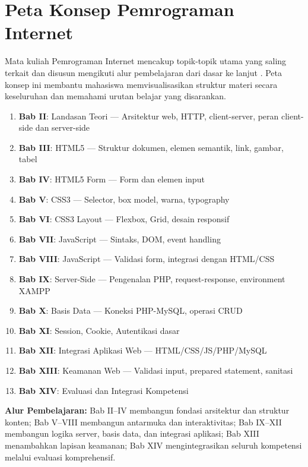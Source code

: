 \section{Peta Konsep Pemrograman Internet}

Mata kuliah Pemrograman Internet mencakup topik-topik utama yang saling terkait dan disusun mengikuti alur pembelajaran dari dasar ke lanjut \cite{mdn-learn}. Peta konsep ini membantu mahasiswa memvisualisasikan struktur materi secara keseluruhan dan memahami urutan belajar yang disarankan.

\begin{enumerate}
  \item \textbf{Bab II}: Landasan Teori --- Arsitektur web, HTTP, client-server, peran client-side dan server-side
  \item \textbf{Bab III}: HTML5 --- Struktur dokumen, elemen semantik, link, gambar, tabel
  \item \textbf{Bab IV}: HTML5 Form --- Form dan elemen input
  \item \textbf{Bab V}: CSS3 --- Selector, box model, warna, typography
  \item \textbf{Bab VI}: CSS3 Layout --- Flexbox, Grid, desain responsif
  \item \textbf{Bab VII}: JavaScript --- Sintaks, DOM, event handling
  \item \textbf{Bab VIII}: JavaScript --- Validasi form, integrasi dengan HTML/CSS
  \item \textbf{Bab IX}: Server-Side --- Pengenalan PHP, request-response, environment XAMPP
  \item \textbf{Bab X}: Basis Data --- Koneksi PHP-MySQL, operasi CRUD
  \item \textbf{Bab XI}: Session, Cookie, Autentikasi dasar
  \item \textbf{Bab XII}: Integrasi Aplikasi Web --- HTML/CSS/JS/PHP/MySQL
  \item \textbf{Bab XIII}: Keamanan Web --- Validasi input, prepared statement, sanitasi
  \item \textbf{Bab XIV}: Evaluasi dan Integrasi Kompetensi
\end{enumerate}

\textbf{Alur Pembelajaran:} Bab II--IV membangun fondasi arsitektur dan struktur konten; Bab V--VIII membangun antarmuka dan interaktivitas; Bab IX--XII membangun logika server, basis data, dan integrasi aplikasi; Bab XIII menambahkan lapisan keamanan; Bab XIV mengintegrasikan seluruh kompetensi melalui evaluasi komprehensif.

